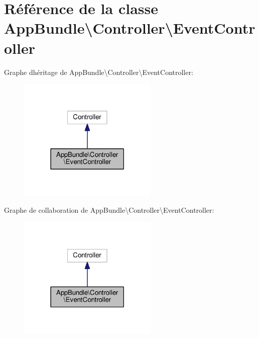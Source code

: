 \hypertarget{classAppBundle_1_1Controller_1_1EventController}{}\section{Référence de la classe App\+Bundle\textbackslash{}Controller\textbackslash{}Event\+Controller}
\label{classAppBundle_1_1Controller_1_1EventController}


Graphe d\textquotesingle{}héritage de App\+Bundle\textbackslash{}Controller\textbackslash{}Event\+Controller\+:\nopagebreak
\begin{figure}[H]
\begin{center}
\leavevmode
\includegraphics[width=189pt]{classAppBundle_1_1Controller_1_1EventController__inherit__graph}
\end{center}
\end{figure}


Graphe de collaboration de App\+Bundle\textbackslash{}Controller\textbackslash{}Event\+Controller\+:\nopagebreak
\begin{figure}[H]
\begin{center}
\leavevmode
\includegraphics[width=189pt]{classAppBundle_1_1Controller_1_1EventController__coll__graph}
\end{center}
\end{figure}
